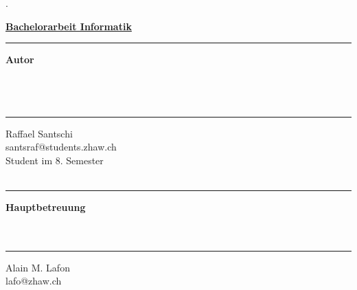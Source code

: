 %
%

\begin{titlepage}


\begin{minipage}[b]{0.117\textwidth}
\hskip 0.05cm
\end{minipage}
\begin{minipage}[b]{0.91\textwidth}
\begin{tiny}.\end{tiny}\vskip 2.8cm
	{\huge
	
	\textbf{\underline{Bachelorarbeit Informatik}}\\
	
	
	\myTitle
	\vskip 0.5cm}
	
	\begin{minipage}[b]{0.27\textwidth}
	\hrule\vskip 0.5cm
		\textbf{Autor}\\
		\\
		\\
		\\
	\end{minipage}
	\begin{minipage}[b]{0.03\textwidth}
	\hskip 0.5cm
	\end{minipage}
	\begin{minipage}[b]{0.7\textwidth}
	\hrule\vskip 0.5cm
		Raffael Santschi\\
		santsraf@students.zhaw.ch\\
		Student im 8. Semester\\
		\\
	\end{minipage}
	
	\begin{minipage}[b]{0.27\textwidth}
	\hrule\vskip 0.5cm
		\textbf{Hauptbetreuung}\\
		\\
		\\
	\end{minipage}
	\begin{minipage}[b]{0.03\textwidth}
	\hskip 0.5cm
	\end{minipage}
	\begin{minipage}[b]{0.7\textwidth}
	\hrule\vskip 0.5cm
		Alain M. Lafon\\
		lafo@zhaw.ch\\
		\\
	\end{minipage}


\end{minipage}
\end{titlepage}
